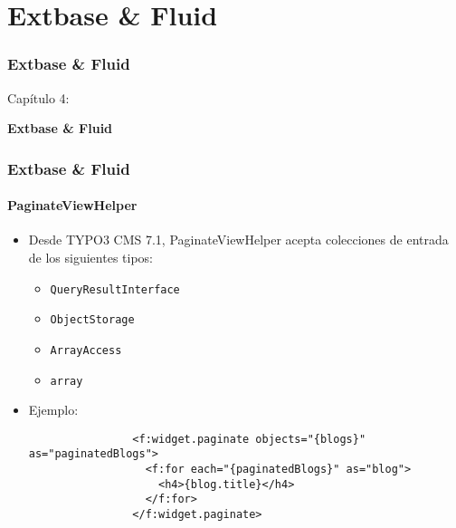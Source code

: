 %

\section{Extbase \& Fluid}
\begin{frame}[fragile]
	\frametitle{Extbase \& Fluid}

	\begin{center}\huge{Capítulo 4:}\end{center}
	\begin{center}\huge{\color{typo3darkgrey}\textbf{Extbase \& Fluid}}\end{center}

\end{frame}


\begin{frame}[fragile]
	\frametitle{Extbase \& Fluid}
	\framesubtitle{PaginateViewHelper}

	\begin{itemize}

		\item Desde TYPO3 CMS 7.1, PaginateViewHelper acepta colecciones de entrada de los siguientes tipos:

			\begin{itemize}
				\item \texttt{QueryResultInterface}
				\item \texttt{ObjectStorage}
				\item \texttt{ArrayAccess}
				\item \texttt{array}
			\end{itemize}

		\item Ejemplo:

			\begin{lstlisting}
				<f:widget.paginate objects="{blogs}" as="paginatedBlogs">
				  <f:for each="{paginatedBlogs}" as="blog">
				    <h4>{blog.title}</h4>
				  </f:for>
				</f:widget.paginate>
			\end{lstlisting}

	\end{itemize}

\end{frame}


